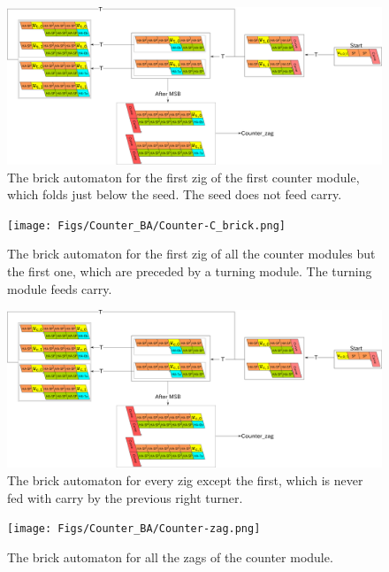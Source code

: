 \documentclass[runningheads]{llncs}
\begin{document}
\begin{figure}[ht]
\centering
\includegraphics[width=\linewidth]{Figs/Counter_BA/Counter-NC_seed_brick.png}
\caption{The brick automaton for the first zig of the first counter module, which folds just below the seed.
The seed does not feed carry.}
\label{fig:BA_counter_nc_seed}
\end{figure}

\begin{figure}[ht]
\centering
\texttt{[image: Figs/Counter\_BA/Counter-C\_brick.png]}
\caption{The brick automaton for the first zig of all the counter modules but the first one, which are preceded by a turning module.
The turning module feeds carry.
}
\label{fig:BA_counter_c}
\end{figure}

\begin{figure}[ht]
\centering
\includegraphics[width=\linewidth]{Figs/Counter_BA/Counter-NC_brick.png}
\caption{The brick automaton for every zig except the first, which is never fed with carry by the previous right turner.}
\label{fig:BA_counter_nc}
\end{figure}

\begin{figure}[ht]
\centering
\texttt{[image: Figs/Counter\_BA/Counter-zag.png]}
\caption{The brick automaton for all the zags of the counter module.}
\label{fig:BA_counter_zag}
\end{figure}
\end{document}
